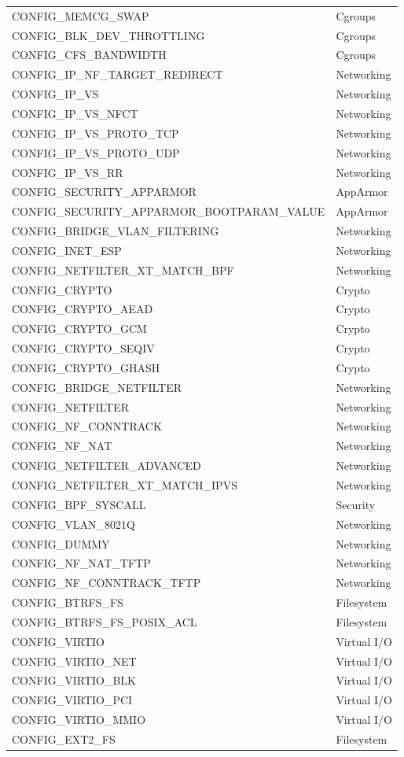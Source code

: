 \begin{doublespace}
\begin{longtable}{|l|l|}
CONFIG\_MEMCG\_SWAP & Cgroups \\
CONFIG\_BLK\_DEV\_THROTTLING & Cgroups \\
CONFIG\_CFS\_BANDWIDTH & Cgroups \\
CONFIG\_IP\_NF\_TARGET\_REDIRECT & Networking \\
CONFIG\_IP\_VS & Networking \\
CONFIG\_IP\_VS\_NFCT & Networking \\
CONFIG\_IP\_VS\_PROTO\_TCP & Networking \\
CONFIG\_IP\_VS\_PROTO\_UDP & Networking \\
CONFIG\_IP\_VS\_RR & Networking \\
CONFIG\_SECURITY\_APPARMOR & AppArmor \\
CONFIG\_SECURITY\_APPARMOR\_BOOTPARAM\_VALUE & AppArmor \\
CONFIG\_BRIDGE\_VLAN\_FILTERING & Networking \\
CONFIG\_INET\_ESP & Networking \\
CONFIG\_NETFILTER\_XT\_MATCH\_BPF & Networking \\
CONFIG\_CRYPTO & Crypto \\
CONFIG\_CRYPTO\_AEAD & Crypto \\
CONFIG\_CRYPTO\_GCM & Crypto \\
CONFIG\_CRYPTO\_SEQIV & Crypto \\
CONFIG\_CRYPTO\_GHASH & Crypto \\
CONFIG\_BRIDGE\_NETFILTER & Networking \\
CONFIG\_NETFILTER & Networking \\
CONFIG\_NF\_CONNTRACK & Networking \\
CONFIG\_NF\_NAT & Networking \\
CONFIG\_NETFILTER\_ADVANCED & Networking \\
CONFIG\_NETFILTER\_XT\_MATCH\_IPVS & Networking \\
CONFIG\_BPF\_SYSCALL & Security \\
CONFIG\_VLAN\_8021Q & Networking \\
CONFIG\_DUMMY & Networking \\
CONFIG\_NF\_NAT\_TFTP & Networking \\
CONFIG\_NF\_CONNTRACK\_TFTP & Networking \\
CONFIG\_BTRFS\_FS & Filesystem \\
CONFIG\_BTRFS\_FS\_POSIX\_ACL & Filesystem \\
CONFIG\_VIRTIO & Virtual I/O \\
CONFIG\_VIRTIO\_NET & Virtual I/O \\
CONFIG\_VIRTIO\_BLK & Virtual I/O \\
CONFIG\_VIRTIO\_PCI & Virtual I/O \\
CONFIG\_VIRTIO\_MMIO & Virtual I/O \\
CONFIG\_EXT2\_FS & Filesystem \\
\hline
\end{longtable}




\end{doublespace}
